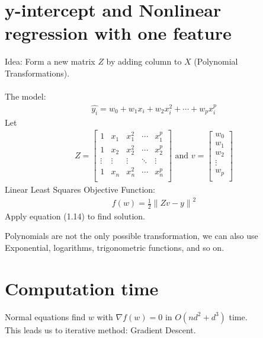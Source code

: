 \section{y-intercept and Nonlinear regression with one feature} \label{sec:}
Idea: Form a new matrix $Z$ by adding column to $X$ (Polynomial Transformations).
\\
\\ The model:
\begin{align}
    \hat{y_i} = w_0 + w_1x_i + w_2x_i^{2} +\cdots + w_px_i^{p}
\end{align}
Let
\begin{align}
    Z = \begin{bmatrix}
     1 & x_1 & x_1^{2} & \cdots  & x_1^{p} \\
     1 & x_2 & x_2^{2} & \cdots  & x_2^{p} \\
     \vdots  & \vdots  & \vdots  & \ddots  & \vdots  \\
     1 & x_n & x_n^{2} & \cdots  & x_n^{p} \\
    \end{bmatrix}
    \text{ and }
    v = \begin{bmatrix}
      w_0 \\
      w_1\\
      w_2\\
      \vdots \\
      w_p\\
    \end{bmatrix}
\end{align} 
Linear Least Squares Objective Function:
\begin{align}
    f(w) = \frac{1}{2}\left\| Zv - y \right\|^{2}
\end{align}
Apply equation (1.14) to find solution.

\begin{remark}
    Polynomials are not the only possible transformation, we can also use Exponential, logarithms, trigonometric functions, and so on.
\end{remark}

\section{Computation time} \label{sec:}

Normal equations find $w$ with $\nabla f(w)=0$ in $O(nd^{2}+d^{3})$ time.
\\This leads us to iterative method: Gradient Descent.